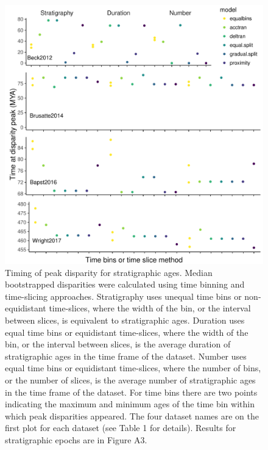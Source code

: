\documentclass[12pt,a4paper]{article}
\begin{document}
\begin{figure}[!htbp]
    \centering
    \includegraphics[width=1\linewidth, height=1\textheight, keepaspectratio]{figures/fig-peaks-age-appendix-revision.pdf}
    \caption[Timing of peak disparity for four example datasets.]
    {Timing of peak disparity for stratigraphic ages.
    Median bootstrapped disparities were calculated using time binning and time-slicing approaches. 
    Stratigraphy uses unequal time bins or non-equidistant time-slices, where the width of the bin, or the interval between slices, is equivalent to stratigraphic ages. 
    Duration uses equal time bins or equidistant time-slices, where the width of the bin, or the interval between slices, is the average duration of stratigraphic ages in the time frame of the dataset. 
    Number uses equal time bins or equidistant time-slices, where the number of bins, or the number of slices, is the average number of stratigraphic ages in the time frame of the dataset. 
    For time bins there are two points indicating the maximum and minimum ages of the time bin within which peak disparities appeared.
    The four dataset names are on the first plot for each dataset (see Table 1 for details).
    Results for stratigraphic epochs are in Figure A3.}
    \label{figure:peak3}
  \end{figure}
\end{document}
